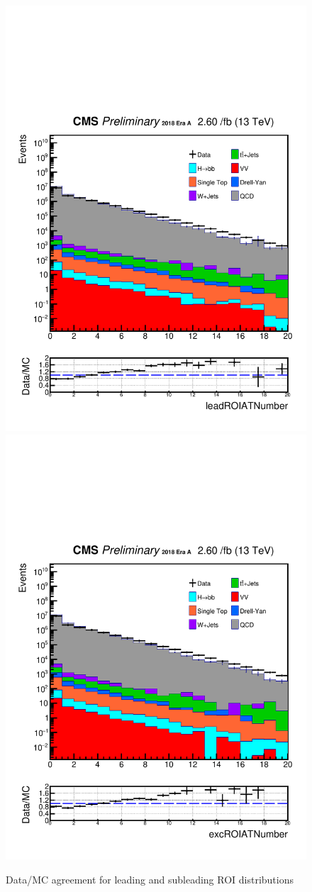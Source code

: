 \begin{figure}[h!]
  \caption{Data/MC agreement for leading and subleading ROI distributions}
  \label{fig:DataMCscore4}
  \centering
  \includegraphics[width=0.57\linewidth]{figs/Data_log_AnalysisNote_MS-15_ctauS-10_leadROIATNumber.pdf}
  \includegraphics[width=0.57\linewidth]{figs/Data_log_AnalysisNote_MS-15_ctauS-10_excROIATNumber.pdf}

\end{figure}

